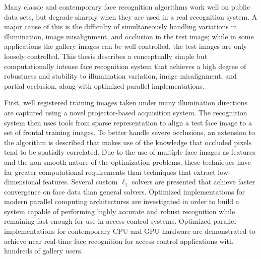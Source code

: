 Many classic and contemporary face recognition algorithms work well on public
data sets, but degrade sharply when they are used in a real recognition system.
A major cause of this is the difficulty of simultaneously handling variations
in illumination, image misalignment, and occlusion in the test image; while in
some applications the gallery images can be well controlled, the test images
are only loosely controlled.  This thesis describes a conceptually simple but
computationally intense face recognition system that achieves a high degree of
robustness and stability to illumination variation, image misalignment, and
partial occlusion, along with optimized parallel implementations.

First, well registered training images taken under many illumination directions
are captured using a novel projector-based acquisition system.  The recognition
system then uses tools from sparse representation to align a test face image to
a set of frontal training images.  To better handle severe occlusions, an
extension to the algorithm is described that makes use of the knowledge that
occluded pixels tend to be spatially correlated.  Due to the use of multiple
face images as features and the non-smooth nature of the optimization
problems, these techniques have far greater computational requirements than
techniques that extract low-dimensional features.  Several custom $\ell_1$
solvers are presented that achieve faster convergence on face data than general
solvers.  Optimized implementations for modern parallel computing architectures
are investigated in order to build a system capable of performing highly
accurate and robust recognition while remaining fast enough for use in access
control systems.  Optimized parallel implementations for contemporary CPU and
GPU hardware are demonstrated to achieve near real-time face recognition for
access control applications with hundreds of gallery users.



